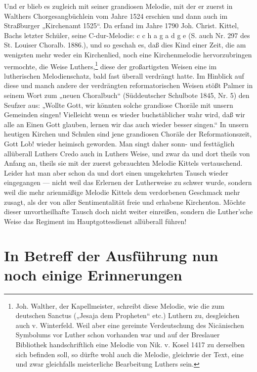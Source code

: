 Und er blieb es zugleich mit seiner grandiosen Melodie, mit der er zuerst in Walthers Chorgesangbüchlein vom Jahre 1524 erschien und dann auch im Straßburger „Kirchenamt 1525“. Da erfand im Jahre 1790 Joh. Christ. Kittel, Bachs letzter Schüler, seine C-dur-Melodie: c c h a g a d g e (S. auch Nr. 297 des St. Louiser Choralb. 1886.), und so geschah es, daß dies Kind einer Zeit, die am wenigsten mehr weder ein Kirchenlied, noch eine Kirchenmelodie hervorzubringen vermochte, die Weise Luthers,\footnote{Joh. Walther, der Kapellmeister, schreibt diese Melodie, wie die zum deutschen Sanctus („Jesaja dem Propheten“ etc.) Luthern zu, desgleichen auch v. Winterfeld. Weil aber eine gereimte Verdeutschung des Nicänischen Symbolums vor Luther schon vorhanden war und auf der Breslauer Bibliothek handschriftlich eine Melodie von Nik. v. Kosel 1417 zu derselben sich befinden soll, so dürfte wohl auch die Melodie, gleichwie der Text, eine und zwar gleichfalls meisterliche Bearbeitung Luthers sein.} diese der großartigsten Weisen eine im lutherischen Melodienschatz, bald fast überall verdrängt hatte. Im Hinblick auf diese und manch andere der verdrängten reformatorischen Weisen stößt Palmer in seinem Wort zum „neuen Choralbuch“ (Süddeutscher Schulbote 1845, Nr. 5) den Seufzer aus: „Wollte Gott, wir könnten solche grandiose Choräle mit unsern Gemeinden singen! Vielleicht wenn es wieder buchstäblicher wahr wird, daß wir alle an Einen Gott glauben, lernen wir das auch wieder besser singen.“ In unsern heutigen Kirchen und Schulen sind jene grandiosen Choräle der Reformationszeit, Gott Lob! wieder heimisch geworden. Man singt daher sonn- und festtäglich allüberall Luthers Credo auch in Luthers Weise, und zwar da und dort theils von Anfang an, theils sie mit der zuerst gebrauchten Melodie Kittels vertauschend. Leider hat man aber schon da und dort einen umgekehrten Tausch wieder eingegangen — nicht weil das Erlernen der Lutherweise zu schwer wurde, sondern weil die mehr arienmäßige Melodie Kittels dem verdorbenen Geschmack mehr zusagt, als der von aller Sentimentalität freie und erhabene Kirchenton. Möchte dieser unvortheilhafte Tausch doch nicht weiter einreißen, sondern die Luther’sche Weise das Regiment im Hauptgottesdienst allüberall führen!

\section[In Betreff der Ausführung]{In Betreff der Ausführung nun noch einige Erinnerungen}

